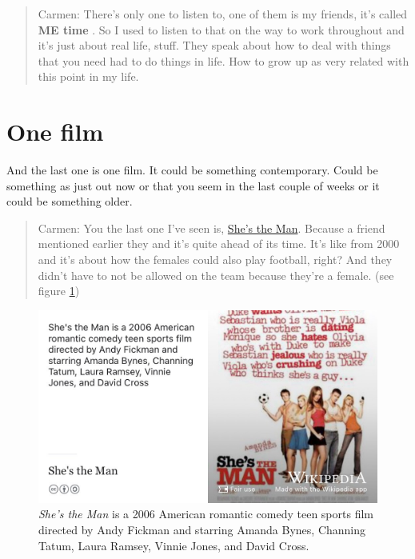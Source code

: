 \documentclass[
]{book}
\begin{document}
\begin{quote}
Carmen: There's only one to listen to, one of them is my friends, it's called \textbf{ME time} \citep{metime}. So I used to listen to that on the way to work throughout and it's just about real life, stuff. They speak about how to deal with things that you need had to do things in life. How to grow up as very related with this point in my life.
\end{quote}

\hypertarget{one-film}{%
\section{One film}\label{one-film}}

And the last one is one film. It could be something contemporary. Could be something as just out now or that you seem in the last couple of weeks or it could be something older.

\begin{quote}
Carmen: You the last one I've seen is, \href{https://en.wikipedia.org/wiki/She\%27s_the_Man}{She's the Man}. \citep{shestheman} Because a friend mentioned earlier they and it's quite ahead of its time. It's like from 2000 and it's about how the females could also play football, right? And they didn't have to not be allowed on the team because they're a female. (see figure \ref{fig:shes-the-man-fig})
\end{quote}

\begin{figure}

{\centering \includegraphics[width=1\linewidth]{images/shes-the-man} 

}

\caption{\emph{She's the Man} is a 2006 American romantic comedy teen sports film directed by Andy Fickman and starring Amanda Bynes, Channing Tatum, Laura Ramsey, Vinnie Jones, and David Cross. \citep{shestheman}}\label{fig:shes-the-man-fig}
\end{figure}
\end{document}
